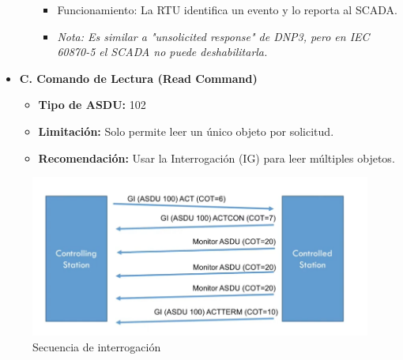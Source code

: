 \documentclass[a5paper]{book}%
\begin{document}
\begin{itemize}
\begin{itemize}
\begin{itemize}
			\item Funcionamiento: La RTU identifica un evento y lo reporta al SCADA.
			\item \textit{Nota: Es similar a "unsolicited response" de DNP3, pero en IEC 60870-5 el SCADA no puede deshabilitarla.}
		\end{itemize}
	\end{itemize}
	\item \textbf{C. Comando de Lectura (Read Command)}
	\begin{itemize}
		\item \textbf{Tipo de ASDU:} 102
		\item \textbf{Limitación:} Solo permite leer un único objeto por solicitud.
		\item \textbf{Recomendación:} Usar la Interrogación (IG) para leer múltiples objetos.
	\end{itemize}
\end{itemize}


\begin{figure}[H]
	\centering
	\caption{Secuencia de interrogación}
	\label{fig:secuenciadeinterrogacion}
	\includegraphics[width=\linewidth]{secuencia_de_interrogacion}
\end{figure}
\end{document}
